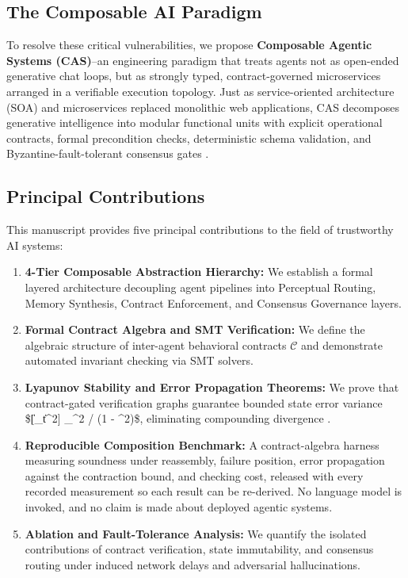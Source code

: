 \documentclass[10pt,journal,compsoc,twocolumn]{IEEEtran}
\begin{document}
\subsection{The Composable AI Paradigm}


To resolve these critical vulnerabilities, we propose \textbf{Composable Agentic Systems (CAS)}--an engineering paradigm that treats agents not as open-ended generative chat loops, but as strongly typed, contract-governed microservices arranged in a verifiable execution topology. Just as service-oriented architecture (SOA) and microservices replaced monolithic web applications, CAS decomposes generative intelligence into modular functional units with explicit operational contracts, formal precondition checks, deterministic schema validation, and Byzantine-fault-tolerant consensus gates \cite{crossref_10_1109_access_2026_3656309,crossref_10_1145_3689096_3689462}.


\subsection{Principal Contributions}


This manuscript provides five principal contributions to the field of trustworthy AI systems:
\begin{enumerate}
  \item \textbf{4-Tier Composable Abstraction Hierarchy:} We establish a formal layered architecture decoupling agent pipelines into Perceptual Routing, Memory Synthesis, Contract Enforcement, and Consensus Governance layers.
  \item \textbf{Formal Contract Algebra and SMT Verification:} We define the algebraic structure of inter-agent behavioral contracts $\mathcal{C}$ and demonstrate automated invariant checking via SMT solvers.
  \item \textbf{Lyapunov Stability and Error Propagation Theorems:} We prove that contract-gated verification graphs guarantee bounded state error variance \$[\|\_t\|^2] \le \sigma\_{\max}^2 / (1 - \rho^2)\$, eliminating compounding divergence \cite{arxiv_2501_02497}.
  \item \textbf{Reproducible Composition Benchmark:} A contract-algebra harness measuring soundness under reassembly, failure position, error propagation against the contraction bound, and checking cost, released with every recorded measurement so each result can be re-derived. No language model is invoked, and no claim is made about deployed agentic systems.
  \item \textbf{Ablation and Fault-Tolerance Analysis:} We quantify the isolated contributions of contract verification, state immutability, and consensus routing under induced network delays and adversarial hallucinations.
\end{enumerate}
\end{document}
